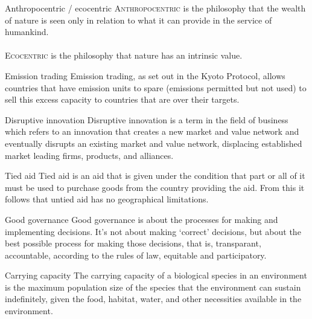 \begin{sortEnvironment}{Anthropocentric / ecocentric}
\textsc{Anthropocentric} is the philosophy that the wealth of nature is seen only in relation to what it can provide in the service of humankind. \\
\\
\textsc{Ecocentric} is the philosophy that nature has an intrinsic value.
\end{sortEnvironment}

\begin{sortEnvironment}{Emission trading}
Emission trading, as set out in the Kyoto Protocol, allows countries that have emission units to spare (emissions permitted but not used) to sell this excess capacity to countries that are over their targets.
\end{sortEnvironment}

\begin{sortEnvironment}{Disruptive innovation}
Disruptive innovation is a term in the field of business which refers to an innovation that creates a new market and value network and eventually disrupts an existing market and value network, displacing established market leading firms, products, and alliances. 
\end{sortEnvironment}

\begin{sortEnvironment}{Tied aid}
Tied aid is an aid that is given under the condition that part or all of it must be used to purchase goods from the country providing the aid. From this it follows that untied aid has no geographical limitations.
\end{sortEnvironment}

\begin{sortEnvironment}{Good governance}
Good governance is about the processes for making and implementing decisions. It’s not about making ‘correct’ decisions, but about the best possible process for making those decisions, that is, transparant, accountable, according to the rules of law, equitable and participatory. 
\end{sortEnvironment}

\begin{sortEnvironment}{Carrying capacity}
The carrying capacity of a biological species in an environment is the maximum population size of the species that the environment can sustain indefinitely, given the food, habitat, water, and other necessities available in the environment. 
\end{sortEnvironment}

